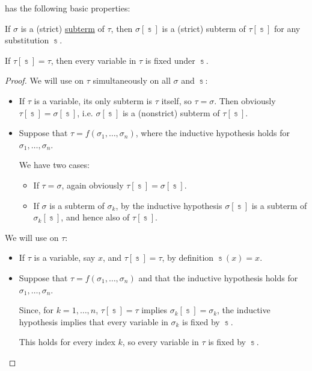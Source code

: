 \begin{proposition}\label{thm:alg:fol_term_substitution}
   has the following basic properties:
  \begin{thmenum}
     If \( \sigma \) is a (strict) \hyperref[def:fol_subterm]{subterm} of \( \tau \), then \( \sigma[\Bbbs] \) is a (strict) subterm of \( \tau[\Bbbs] \) for any substitution \( \Bbbs \).

     If \( \tau[\Bbbs] = \tau \), then every variable in \( \tau \) is fixed under \( \Bbbs \).
  \end{thmenum}
\end{proposition}
\begin{proof}
   We will use  on \( \tau \) simultaneously on all \( \sigma \) and \( \Bbbs \):
  \begin{itemize}
    \item If \( \tau \) is a variable, its only subterm is \( \tau \) itself, so \( \tau = \sigma \). Then obviously \( \tau[\Bbbs] = \sigma[\Bbbs] \), i.e. \( \sigma[\Bbbs] \) is a (nonstrict) subterm of \( \tau[\Bbbs] \).
    \item Suppose that \( \tau = f(\sigma_1, \ldots, \sigma_n) \), where the inductive hypothesis holds for \( \sigma_1, \ldots, \sigma_n \).

    We have two cases:
    \begin{itemize}
      \item If \( \tau = \sigma \), again obviously \( \tau[\Bbbs] = \sigma[\Bbbs] \).
      \item If \( \sigma \) is a subterm of \( \sigma_k \), by the inductive hypothesis \( \sigma[\Bbbs] \) is a subterm of \( \sigma_k[\Bbbs] \), and hence also of \( \tau[\Bbbs] \).
    \end{itemize}
  \end{itemize}

   We will use  on \( \tau \):
  \begin{itemize}
    \item If \( \tau \) is a variable, say \( x \), and \( \tau[\Bbbs] = \tau \), by definition \( \Bbbs(x) = x \).
    \item Suppose that \( \tau = f(\sigma_1, \ldots, \sigma_n) \) and that the inductive hypothesis holds for \( \sigma_1, \ldots, \sigma_n \).

    Since, for \( k = 1, \ldots, n \), \( \tau[\Bbbs] = \tau \) implies \( \sigma_k[\Bbbs] = \sigma_k \), the inductive hypothesis implies that every variable in \( \sigma_k \) is fixed by \( \Bbbs \).

    This holds for every index \( k \), so every variable in \( \tau \) is fixed by \( \Bbbs \).
  \end{itemize}
\end{proof}

